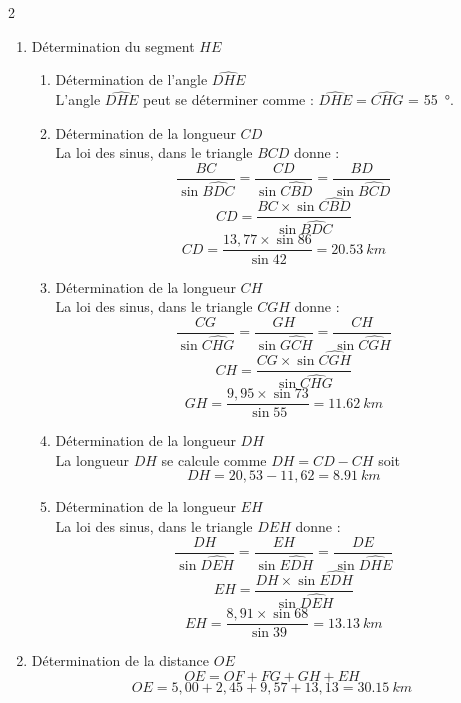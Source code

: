 \documentclass[a4paper,11pt,fleqn]{article}%
\begin{document}
\begin{multicols}{2}
\begin{enumerate}
    \item Détermination du segment $HE$
        \begin{enumerate}
            \item Détermination de l'angle $\widehat{DHE}$\\
            L'angle $\widehat{DHE}$ peut se déterminer comme : $\widehat{DHE} = \widehat{CHG}$ = \SI{55}{\degree}.
            \item Détermination de la longueur $CD$\\
            La loi des sinus, dans le triangle $BCD$ donne : $$\dfrac{BC}{\sin{\widehat{BDC}}}=\dfrac{CD}{\sin{\widehat{CBD}}}=\dfrac{BD}{\sin{\widehat{BCD}}}$$
            $$CD = \dfrac{BC \times \sin{\widehat{CBD}}}{\sin{\widehat{BDC}}}$$
            $$CD = \dfrac{13,77 \times \sin{86}}{\sin{42}} = \SI{20,53}{km}$$
            \item Détermination de la longueur $CH$\\
            La loi des sinus, dans le triangle $CGH$ donne : $$\dfrac{CG}{\sin{\widehat{CHG}}}=\dfrac{GH}{\sin{\widehat{GCH}}}=\dfrac{CH}{\sin{\widehat{CGH}}}$$
            $$CH=\dfrac{CG\times \sin{\widehat{CGH}}}{\sin{\widehat{CHG}}}$$
            $$GH=\dfrac{9,95\times \sin{73}}{\sin{55}}=\SI{11,62}{km}$$
            \item Détermination de la longueur $DH$\\
            La longueur $DH$ se calcule comme $DH=CD-CH$ soit $$DH = 20,53 - 11,62 = \SI{8,91}{km}$$
            \item Détermination de la longueur $EH$\\
            La loi des sinus, dans le triangle $DEH$ donne : $$\dfrac{DH}{\sin{\widehat{DEH}}} = \dfrac{EH}{\sin{\widehat{EDH}}} =\dfrac{DE}{\sin{\widehat{DHE}}}$$
            $$EH = \dfrac{DH \times \sin{\widehat{EDH}}}{\sin{\widehat{DEH}}}$$
            $$EH = \dfrac{8,91 \times \sin{68}}{\sin{39}} = \SI{13,13}{km}$$
        \end{enumerate}
    \item Détermination de la distance $OE$
        $$OE = OF + FG + GH+ EH$$
        $$OE = 5,00 + 2,45 + 9,57 + 13,13 = \SI{30,15}{km}$$
\end{enumerate}
\end{multicols}
\end{document}
